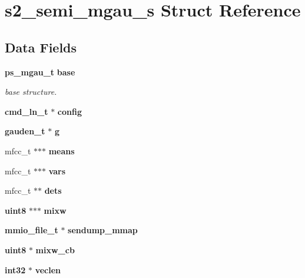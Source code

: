 \section{s2\-\_\-semi\-\_\-mgau\-\_\-s \-Struct \-Reference}
\label{structs2__semi__mgau__s}
\subsection*{\-Data \-Fields}
\begin{DoxyCompactItemize}
\item 
{\bf ps\-\_\-mgau\-\_\-t} {\bf base}
\begin{DoxyCompactList}\small\item\em base structure. \end{DoxyCompactList}\item 
{\bf cmd\-\_\-ln\-\_\-t} $\ast$ {\bfseries config}\label{structs2__semi__mgau__s_ababf1e9522fb14c351df9a6b6d3957bc}

\item 
{\bf gauden\-\_\-t} $\ast$ {\bfseries g}\label{structs2__semi__mgau__s_ab9d5d5dcafa40af8869ceabb60a8d35b}

\item 
mfcc\-\_\-t $\ast$$\ast$$\ast$ {\bfseries means}\label{structs2__semi__mgau__s_a22ebad1d9b3ffa6dad349cc3eec0b092}

\item 
mfcc\-\_\-t $\ast$$\ast$$\ast$ {\bfseries vars}\label{structs2__semi__mgau__s_a724a8e6bca376cbd091c1ab4ddeb43e0}

\item 
mfcc\-\_\-t $\ast$$\ast$ {\bfseries dets}\label{structs2__semi__mgau__s_ad93b0a6ed646349a2a81f88acbb535dd}

\item 
{\bf uint8} $\ast$$\ast$$\ast$ {\bfseries mixw}\label{structs2__semi__mgau__s_a1207b5db7e37e9477f3b55cc2d447050}

\item 
{\bf mmio\-\_\-file\-\_\-t} $\ast$ {\bfseries sendump\-\_\-mmap}\label{structs2__semi__mgau__s_a66a60126fe057d36640cbf69f916bca3}

\item 
{\bf uint8} $\ast$ {\bfseries mixw\-\_\-cb}\label{structs2__semi__mgau__s_a20ec32cb8c38fb48909b2cc7c5412c3b}

\item 
{\bf int32} $\ast$ {\bfseries veclen}\label{structs2__semi__mgau__s_a73331a6f5833db8cd4c8301ffe54be5e}


\end{DoxyCompactItemize}
